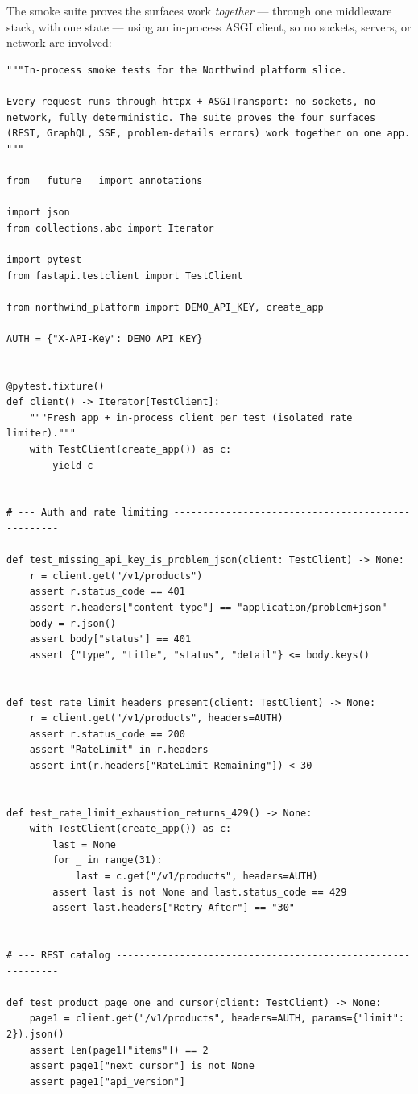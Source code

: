 The smoke suite proves the surfaces work \emph{together} --- through one
middleware stack, with one state --- using an in-process ASGI client, so no
sockets, servers, or network are involved:

\begin{verbatim}
"""In-process smoke tests for the Northwind platform slice.

Every request runs through httpx + ASGITransport: no sockets, no
network, fully deterministic. The suite proves the four surfaces
(REST, GraphQL, SSE, problem-details errors) work together on one app.
"""

from __future__ import annotations

import json
from collections.abc import Iterator

import pytest
from fastapi.testclient import TestClient

from northwind_platform import DEMO_API_KEY, create_app

AUTH = {"X-API-Key": DEMO_API_KEY}


@pytest.fixture()
def client() -> Iterator[TestClient]:
    """Fresh app + in-process client per test (isolated rate limiter)."""
    with TestClient(create_app()) as c:
        yield c


# --- Auth and rate limiting --------------------------------------------------

def test_missing_api_key_is_problem_json(client: TestClient) -> None:
    r = client.get("/v1/products")
    assert r.status_code == 401
    assert r.headers["content-type"] == "application/problem+json"
    body = r.json()
    assert body["status"] == 401
    assert {"type", "title", "status", "detail"} <= body.keys()


def test_rate_limit_headers_present(client: TestClient) -> None:
    r = client.get("/v1/products", headers=AUTH)
    assert r.status_code == 200
    assert "RateLimit" in r.headers
    assert int(r.headers["RateLimit-Remaining"]) < 30


def test_rate_limit_exhaustion_returns_429() -> None:
    with TestClient(create_app()) as c:
        last = None
        for _ in range(31):
            last = c.get("/v1/products", headers=AUTH)
        assert last is not None and last.status_code == 429
        assert last.headers["Retry-After"] == "30"


# --- REST catalog ------------------------------------------------------------

def test_product_page_one_and_cursor(client: TestClient) -> None:
    page1 = client.get("/v1/products", headers=AUTH, params={"limit": 2}).json()
    assert len(page1["items"]) == 2
    assert page1["next_cursor"] is not None
    assert page1["api_version"]


\end{verbatim}
